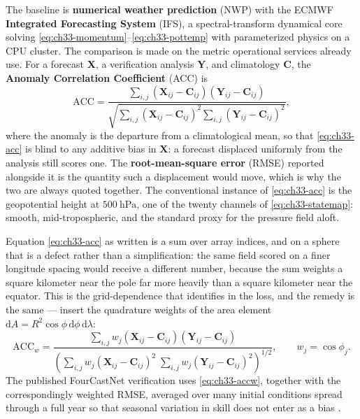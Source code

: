 The baseline is \textbf{numerical weather prediction} (NWP) with the ECMWF
\textbf{Integrated Forecasting System} (IFS), a spectral-transform dynamical core solving
\eqref{eq:ch33-momentum}--\eqref{eq:ch33-pottemp} with parameterized physics on a CPU
cluster. The comparison is made on the metric operational services already use. For a
forecast $\mathbf{X}$, a verification analysis $\mathbf{Y}$, and climatology
$\mathbf{C}$, the \textbf{Anomaly Correlation Coefficient} (ACC) is
\begin{equation}
  \label{eq:ch33-acc}
  \text{ACC} = \frac{\sum_{i,j} (\mathbf{X}_{ij} - \mathbf{C}_{ij}) (\mathbf{Y}_{ij} - \mathbf{C}_{ij})}{\sqrt{\sum_{i,j} (\mathbf{X}_{ij} - \mathbf{C}_{ij})^2 \sum_{i,j} (\mathbf{Y}_{ij} - \mathbf{C}_{ij})^2}},
\end{equation}
where the anomaly is the departure from a climatological mean, so that
\eqref{eq:ch33-acc} is blind to any additive bias in $\mathbf{X}$: a forecast displaced
uniformly from the analysis still scores one. The \textbf{root-mean-square error} (RMSE)
reported alongside it is the quantity such a displacement would move, which is why the two
are always quoted together. The conventional instance of \eqref{eq:ch33-acc} is the
geopotential height at $500\ \mathrm{hPa}$, one of the twenty channels of
\eqref{eq:ch33-statemap}: smooth, mid-tropospheric, and the standard proxy for the pressure
field aloft.

Equation \eqref{eq:ch33-acc} as written is a sum over array indices, and on a sphere that
is a defect rather than a simplification: the same field scored on a finer longitude
spacing would receive a different number, because the sum weights a square kilometer near
the pole far more heavily than a square kilometer near the equator. This is the
grid-dependence that 
identifies in the loss, and the remedy is the same --- insert the quadrature weights of the
area element $\mathrm{d}A = R^2 \cos\phi\, \mathrm{d}\phi\, \mathrm{d}\lambda$:
\begin{equation}
  \label{eq:ch33-accw}
  \text{ACC}_w = \frac{\sum_{i,j} w_j (\mathbf{X}_{ij} - \mathbf{C}_{ij}) (\mathbf{Y}_{ij} - \mathbf{C}_{ij})}{\left(\sum_{i,j} w_j (\mathbf{X}_{ij} - \mathbf{C}_{ij})^2 \; \sum_{i,j} w_j (\mathbf{Y}_{ij} - \mathbf{C}_{ij})^2\right)^{1/2}},
  \qquad w_j = \cos\phi_j .
\end{equation}
The published FourCastNet verification uses \eqref{eq:ch33-accw}, together with the
correspondingly weighted RMSE, averaged over many
initial conditions spread through a full year so that seasonal variation in skill does not
enter as a bias \cite{pathak2022fourcastnet}. 

